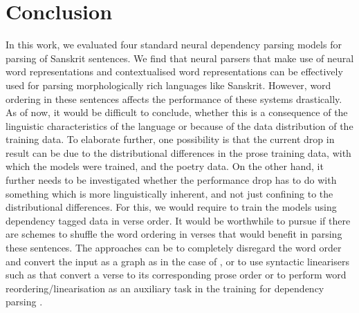 \documentclass[11pt]{article}
\begin{document}

\section{Conclusion}

In this work, we evaluated four standard neural dependency parsing models for parsing of Sanskrit sentences. We find that neural parsers that make use of neural word representations and contextualised word representations can be effectively used for parsing morphologically rich languages like Sanskrit. However, word ordering in these sentences affects the performance of these systems drastically. As of now, it would be difficult to conclude, whether this is a consequence of the linguistic characteristics of the language or because of the data distribution of the training data. To elaborate further, one possibility is that the current drop in result can  be due to the distributional differences in the prose training data, with which the models were trained, and the poetry data. On the other hand, it further needs to be  investigated whether the performance drop has to do with something which is more linguistically inherent, and not just confining to the distributional differences. For this, we would require to train the models using dependency tagged data in verse order. It would be worthwhile to pursue if there are schemes to shuffle the word ordering in verses that would benefit in parsing these sentences. The approaches can be to completely disregard the word order and convert the input as a graph as in the case of , or to use syntactic linearisers such as  that convert a verse to its corresponding prose order or to  perform word reordering/linearisation as an auxiliary task in the training for dependency parsing \cite{wang-etal-2018-improved}.
\end{document}
